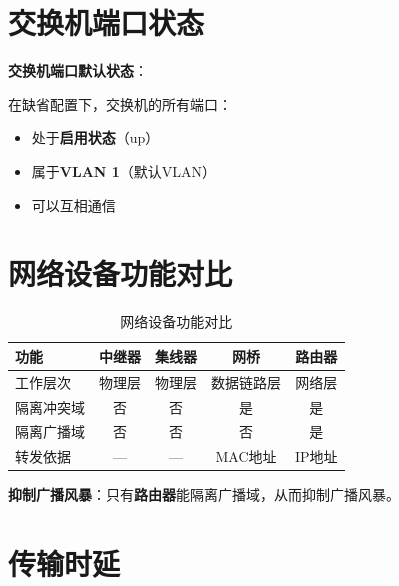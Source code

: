 \documentclass[12pt,a4paper]{ctexart}
\begin{document}
\section{交换机端口状态}

\begin{keybox}
\textbf{交换机端口默认状态}：

在缺省配置下，交换机的所有端口：
\begin{itemize}[itemsep=0pt]
    \item 处于\textbf{启用状态}（up）
    \item 属于\textbf{VLAN 1}（默认VLAN）
    \item 可以互相通信
\end{itemize}
\end{keybox}

\section{网络设备功能对比}

\begin{table}[htbp]
\centering\small
\begin{tabular}{lcccc}
\toprule
\textbf{功能} & \textbf{中继器} & \textbf{集线器} & \textbf{网桥} & \textbf{路由器} \\
\midrule
工作层次 & 物理层 & 物理层 & 数据链路层 & 网络层 \\
隔离冲突域 & 否 & 否 & 是 & 是 \\
隔离广播域 & 否 & 否 & 否 & 是 \\
转发依据 & — & — & MAC地址 & IP地址 \\
\bottomrule
\end{tabular}
\caption{网络设备功能对比}
\end{table}

\begin{keybox}
\textbf{抑制广播风暴}：只有\textbf{路由器}能隔离广播域，从而抑制广播风暴。
\end{keybox}

\section{传输时延}
\end{document}
